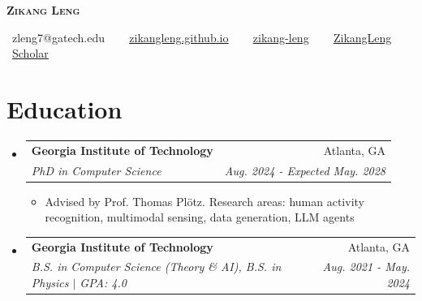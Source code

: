 \documentclass[letterpaper,11pt]{article}
\makeatletter
\newcommand{\resumeItem}[1]{
  \item\small{
    {#1 \vspace{-2pt}}
  }
}
\newcommand{\resumeSubheading}[4]{
  \vspace{-2pt}\item
    \begin{tabular*}{0.99\textwidth}[t]{l@{\extracolsep{\fill}}r}
      \textbf{#1} & #2 \\
      \textit{\small#3} & \textit{\small #4} \\
    \end{tabular*}\vspace{-4pt}
}
\newcommand{\resumeSubHeadingListStart}{\begin{itemize}[leftmargin=0.0in, label={}]}
\newcommand{\resumeSubHeadingListEnd}{\end{itemize}}
\newcommand{\resumeItemListStart}{\begin{itemize}}
\newcommand{\resumeItemListEnd}{\end{itemize}\vspace{-5pt}}
\makeatother
\begin{document}


\begin{center}
    \textbf{\Huge \scshape Zikang Leng} \\ \vspace{8pt}
    
    \faEnvelopeO \ {zleng7@gatech.edu} $\quad$ 
    \faHome \ {\href{https://zikangleng.github.io/}{\underline{zikangleng.github.io}}} $\quad$
    \faLinkedin \ {\href{https://linkedin.com/in/zikang-leng}{\underline{zikang-leng}}} $\quad$
    \faGithub \ {\href{https://github.com/ZikangLeng}{\underline{ZikangLeng}}} $\quad$
    \faGraduationCap \ {\href{https://scholar.google.com/citations?user=P6qXmC8AAAAJ&hl=en}{\underline{Scholar}}} 
\end{center}




\vspace{-0.3in}
\section{Education}
  \resumeSubHeadingListStart
    \resumeSubheading
      {Georgia Institute of Technology }{Atlanta, GA}
      {PhD in Computer Science}{ Aug. 2024 - Expected May. 2028}
      \resumeItemListStart
      \resumeItem{Advised by Prof. Thomas Pl\"{o}tz. Research areas: human activity recognition, multimodal sensing, data generation, LLM agents}
    \resumeItemListEnd
    
    \resumeSubheading
      {Georgia Institute of Technology }{Atlanta, GA}
      {B.S. in Computer Science (Theory \& AI), B.S. in Physics $|$ GPA: 4.0}{Aug. 2021 - May. 2024}
  \resumeSubHeadingListEnd
\end{document}
